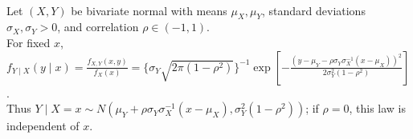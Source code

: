\begin{example} \label{ex:bivariate-normal-conditional-density} \\
Let $(X,Y)$ be bivariate normal with means $\mu_X,\mu_Y$, standard deviations $\sigma_X,\sigma_Y>0$, and correlation $\rho\in(-1,1)$.\\
For fixed $x$, $f_{Y\mid X}(y\mid x)=\frac{f_{X,Y}(x,y)}{f_X(x)}=\{\sigma_Y\sqrt{2\pi(1-\rho^2)}\}^{-1}\exp\left[-\frac{(y-\mu_Y-\rho\sigma_Y\sigma_X^{-1}(x-\mu_X))^2}{2\sigma_Y^2(1-\rho^2)}\right]$.\\
Thus $Y\mid X=x\sim N(\mu_Y+\rho\sigma_Y\sigma_X^{-1}(x-\mu_X),\sigma_Y^2(1-\rho^2))$; if $\rho=0$, this law is independent of $x$.
\end{example}
